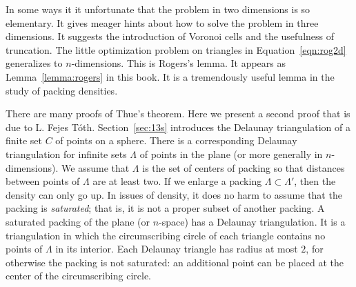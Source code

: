 In some ways it it unfortunate that the problem in two dimensions is so
elementary.  It gives meager hints about how to solve the problem in
three dimensions.   It suggests the
introduction of Voronoi cells and the usefulness of truncation.
The little optimization problem on triangles in Equation~\ref{eqn:rog2d}
generalizes to $n$-dimensions.  This is Rogers's lemma.
It appears as Lemma~\ref{lemma:rogers} in this book.  It is a tremendously useful lemma in the study of packing densities.


\bigskip

There are many proofs of Thue's theorem.  Here we present a second proof
that is due to L. Fejes T\'oth.  Section~\ref{sec:13s} 
introduces the Delaunay
triangulation of a finite set $C$ of points on a sphere.
There is a corresponding Delaunay triangulation for infinite sets $\Lambda$
of points in the plane (or more generally in $n$-dimensions).  We
assume that $\Lambda$ is the set of centers of packing so that
distances between points of $\Lambda$ are at least two.  
If we enlarge a packing
$\Lambda\subset\Lambda'$, then the density can only go up.  In issues
of density, it does no harm to assume that the packing is {\it saturated}; that is, it is not a proper subset of another packing.  A saturated
packing of the plane (or $n$-space) has a Delaunay triangulation.  It
is a triangulation in which the circumscribing circle of each triangle
contains no points of $\Lambda$ in its interior.   Each Delaunay
triangle has
radius at most $2$, for otherwise the packing is not saturated: an additional point can be placed at the center of the circumscribing circle.

